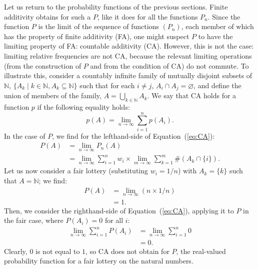 Let us return to the probability functions of the previous sections. Finite additivity obtains for such a $P$, like it does for all the functions $P_n$. Since the function $P$ is the limit of the sequence of functions $\left( P_n \right)$, each member of which has the property of finite additivity (FA), one might suspect $P$ to have the limiting property of FA: countable additivity (CA). However, this is not the case: limiting relative frequencies are not CA, because the relevant limiting operations (from the construction of $P$ and from the condition of CA) do not commute. To illustrate this, consider a countably infinite family of mutually disjoint subsets of $\mathbb{N}$, $\{ A_k \mid k \in \mathbb{N}, A_k \subseteq \mathbb{N} \}$ such that for each $i \neq j$, $A_i \cap A_j = \varnothing$, and define the union of members of the family, $A = \bigcup_{k \in \mathbb{N}} A_k$. We say that CA holds for a function $p$ if the following equality holds:
\begin{equation}\label{eq:CA}
p(A) = \lim_{n \rightarrow \infty} \sum_{i=1}^{n} p(A_i).
\end{equation}
In the case of $P$, we find for the lefthand-side of Equation~(\ref{eq:CA}):
$$
\begin{aligned}
P(A) &= \lim_{n \rightarrow \infty} P_n(A)\\
     &= \lim_{n \rightarrow \infty} \sum_{i=1}^{n}w_i \times\lim_{m \rightarrow \infty}\sum_{k =1}^m \#(A_k \cap \{i\}).
\end{aligned}
$$
Let us now consider a fair lottery (substituting $w_i=1/n$) with $A_k=\{k\}$ such that $A=\mathbb{N}$; we find:
$$
\begin{aligned}
P(A) &=\lim_{n \rightarrow \infty} (n \times 1/n)\\
     &= 1.
\end{aligned}
$$
Then, we consider the righthand-side of Equation~(\ref{eq:CA}), applying it to $P$ in the fair case, where $P(A_i)=0$ for all $i$:
$$
\begin{aligned}
\lim_{n \rightarrow \infty} \sum_{i=1}^{n} P(A_i) &= \lim_{n \rightarrow \infty} \sum_{i=1}^{n} 0\\
  &= 0.
\end{aligned}
$$
Clearly, $0$ is not equal to $1$, so CA does not obtain for $P$, the real-valued probability function for a fair lottery on the natural numbers.

